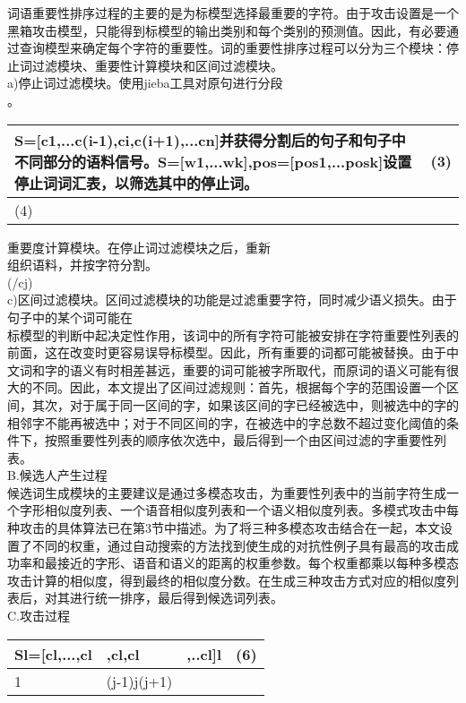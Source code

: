 \documentclass[
]{article}
\begin{document}
词语重要性排序过程的主要的是为标模型选择最重要的字符。由于攻击设置是一个黑箱攻击模型，只能得到标模型的输出类别和每个类别的预测值。因此，有必要通过查询模型来确定每个字符的重要性。词的重要性排序过程可以分为三个模块：停止词过滤模块、重要性计算模块和区间过滤模块。\\
a)停止词过滤模块。使用jieba工具对原句进行分段\\
。

\begin{longtable}[]{@{}ll@{}}
\toprule
S={[}c1,...c(i-1),ci,c(i+1),...cn{]}并获得分割后的句子和句子中不同部分的语料信号。S={[}w1,...wk{]},pos={[}pos1,...posk{]}设置停止词词汇表，以筛选其中的停止词。
& (3) \\
\midrule
\endhead
(4) & \\
\bottomrule
\end{longtable}

重要度计算模块。在停止词过滤模块之后，重新\\
组织语料，并按字符分割。\\
(/cj)\\
c)区间过滤模块。区间过滤模块的功能是过滤重要字符，同时减少语义损失。由于句子中的某个词可能在\\
标模型的判断中起决定性作用，该词中的所有字符可能被安排在字符重要性列表的前面，这在改变时更容易误导标模型。因此，所有重要的词都可能被替换。由于中文词和字的语义有时相差甚远，重要的词可能被字所取代，而原词的语义可能有很大的不同。因此，本文提出了区间过滤规则：首先，根据每个字的范围设置一个区间，其次，对于属于同一区间的字，如果该区间的字已经被选中，则被选中的字的相邻字不能再被选中；对于不同区间的字，在被选中的字总数不超过变化阈值的条件下，按照重要性列表的顺序依次选中，最后得到一个由区间过滤的字重要性列表。\\
B.候选人产生过程\\
候选词生成模块的主要建议是通过多模态攻击，为重要性列表中的当前字符生成一个字形相似度列表、一个语音相似度列表和一个语义相似度列表。多模式攻击中每种攻击的具体算法已在第3节中描述。为了将三种多模态攻击结合在一起，本文设置了不同的权重，通过自动搜索的方法找到使生成的对抗性例子具有最高的攻击成功率和最接近的字形、语音和语义的距离的权重参数。每个权重都乘以每种多模态攻击计算的相似度，得到最终的相似度分数。在生成三种攻击方式对应的相似度列表后，对其进行统一排序，最后得到候选词列表。\\
C.攻击过程

\begin{longtable}[]{@{}llll@{}}
\toprule
Sl={[}cl,...,cl & ,cl,cl & ,..cl{]}l & (6) \\
\midrule
\endhead
1 & (j-1)j(j+1) & & \\
\bottomrule
\end{longtable}
\end{document}
